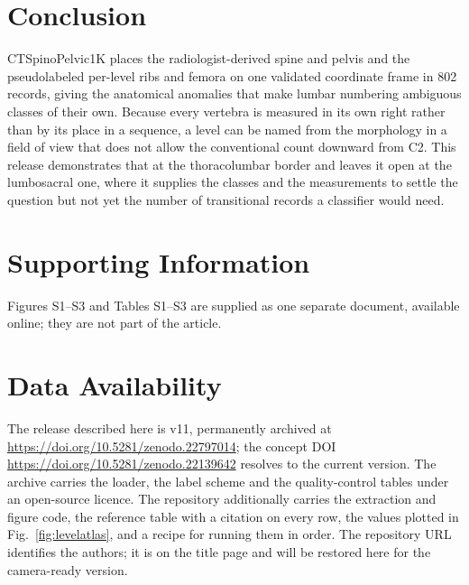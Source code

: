 \documentclass[aapm,mph,amsmath,amssymb,preprint,linenumbers]{revtex4-2}
\newcommand{\datasetdoi}{10.5281/zenodo.22139642}
\newcommand{\datasetversiondoi}{10.5281/zenodo.22797014}
\newcommand{\datasetversion}{v11}
\newif\ifreview \reviewtrue
\newcommand{\doiurl}[1]{\url{https://doi.org/#1}}
\begin{document}
\section{Conclusion}

CTSpinoPelvic1K places the radiologist-derived spine and pelvis and the pseudolabeled per-level
ribs and femora on one validated coordinate frame in 802 records, giving the anatomical
anomalies that make lumbar numbering ambiguous classes of their own.
Because every vertebra is measured in its own right rather than by its place in a sequence, a
level can be named from the morphology in a field of view that does not allow the
conventional count downward from C2. This release demonstrates that at the thoracolumbar
border and leaves it open at the lumbosacral one, where it supplies the classes and the
measurements to settle the question but not yet the number of transitional records a
classifier would need. 

\section*{Supporting Information}
Figures S1--S3 and Tables S1--S3 are supplied as one separate document, available online;
they are not part of the article.

\section*{Data Availability}
The release described here is \datasetversion{}, permanently archived at
\doiurl{\datasetversiondoi}; the concept DOI \doiurl{\datasetdoi} resolves to the
current version.
The archive carries the loader, the label scheme and the quality-control tables under an
open-source licence. The repository additionally carries the extraction and figure code,
the reference table with a citation on every row, the values plotted in
Fig.~\ref{fig:levelatlas}, and a recipe for running them in order. \ifreview The
repository URL identifies the authors; it is on the title page and will be restored here for
the camera-ready version.\else Code:
\url{https://github.com/OpenSpineConsortium/CTSpinoPelvic1K} (article materials under
\texttt{paper/mpda/}); convenience mirror:
\url{https://huggingface.co/datasets/OpenSpineConsortium/CTSpinoPelvic1K}; measurement
toolkit: \url{https://github.com/OpenSpineConsortium/OpenSpineToolkit}.\fi
\end{document}
